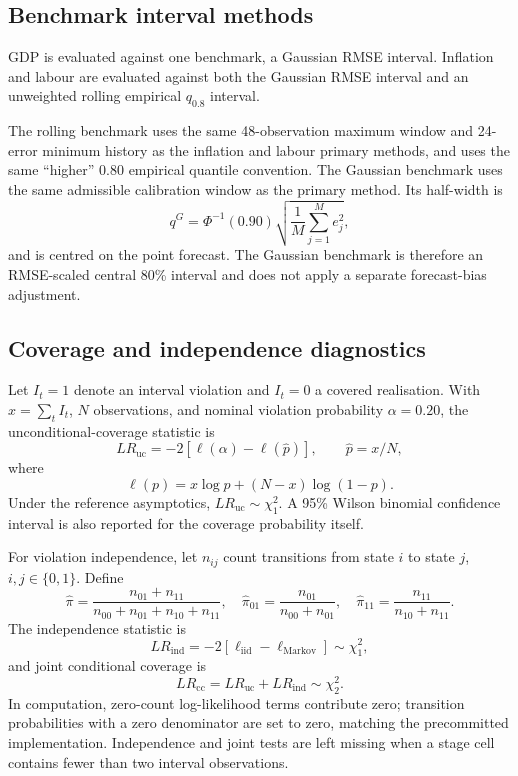 \subsection{Benchmark interval methods}

GDP is evaluated against one benchmark, a Gaussian RMSE interval.  Inflation
and labour are evaluated against both the Gaussian RMSE interval and an
unweighted rolling empirical \(q_{0.8}\) interval.

The rolling benchmark uses the same 48-observation maximum window and
24-error minimum history as the inflation and labour primary methods, and
uses the same ``higher'' 0.80 empirical quantile convention.  The Gaussian
benchmark uses the same admissible calibration window as the primary method.
Its half-width is
\[
    q^G
    =
    \Phi^{-1}(0.90)
    \sqrt{\frac{1}{M}\sum_{j=1}^{M} e_j^2},
\]
and is centred on the point forecast.  The Gaussian benchmark is therefore
an RMSE-scaled central 80\% interval and does not apply a separate
forecast-bias adjustment.

\subsection{Coverage and independence diagnostics}

Let \(I_t=1\) denote an interval violation and \(I_t=0\) a covered
realisation.  With \(x=\sum_t I_t\), \(N\) observations, and nominal
violation probability \(\alpha=0.20\), the unconditional-coverage statistic
is
\[
    LR_{\mathrm{uc}}
    =
    -2\left[
        \ell(\alpha)-\ell(\widehat p)
    \right],
    \qquad
    \widehat p=x/N,
\]
where
\[
    \ell(p)=x\log p+(N-x)\log(1-p).
\]
Under the reference asymptotics,
\(LR_{\mathrm{uc}}\sim\chi^2_1\).  A 95\% Wilson binomial confidence interval
is also reported for the coverage probability itself.

For violation independence, let \(n_{ij}\) count transitions from state
\(i\) to state \(j\), \(i,j\in\{0,1\}\).  Define
\[
    \widehat\pi
    =
    \frac{n_{01}+n_{11}}{n_{00}+n_{01}+n_{10}+n_{11}},
    \quad
    \widehat\pi_{01}
    =
    \frac{n_{01}}{n_{00}+n_{01}},
    \quad
    \widehat\pi_{11}
    =
    \frac{n_{11}}{n_{10}+n_{11}}.
\]
The independence statistic is
\[
    LR_{\mathrm{ind}}
    =
    -2\left[
        \ell_{\mathrm{iid}}-\ell_{\mathrm{Markov}}
    \right]
    \sim\chi^2_1,
\]
and joint conditional coverage is
\[
    LR_{\mathrm{cc}}
    =
    LR_{\mathrm{uc}}+LR_{\mathrm{ind}}
    \sim\chi^2_2.
\]
In computation, zero-count log-likelihood terms contribute zero; transition
probabilities with a zero denominator are set to zero, matching the
precommitted implementation.  Independence and joint tests are left missing
when a stage cell contains fewer than two interval observations.

